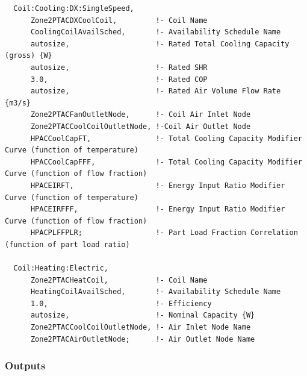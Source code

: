 \begin{lstlisting}
  Coil:Cooling:DX:SingleSpeed,
      Zone2PTACDXCoolCoil,         !- Coil Name
      CoolingCoilAvailSched,       !- Availability Schedule Name
      autosize,                    !- Rated Total Cooling Capacity (gross) {W}
      autosize,                    !- Rated SHR
      3.0,                         !- Rated COP
      autosize,                    !- Rated Air Volume Flow Rate {m3/s}
      Zone2PTACFanOutletNode,      !- Coil Air Inlet Node
      Zone2PTACCoolCoilOutletNode, !-Coil Air Outlet Node
      HPACCoolCapFT,               !- Total Cooling Capacity Modifier Curve (function of temperature)
      HPACCoolCapFFF,              !- Total Cooling Capacity Modifier Curve (function of flow fraction)
      HPACEIRFT,                   !- Energy Input Ratio Modifier Curve (function of temperature)
      HPACEIRFFF,                  !- Energy Input Ratio Modifier Curve (function of flow fraction)
      HPACPLFFPLR;                 !- Part Load Fraction Correlation (function of part load ratio)

  Coil:Heating:Electric,
      Zone2PTACHeatCoil,           !- Coil Name
      HeatingCoilAvailSched,       !- Availability Schedule Name
      1.0,                         !- Efficiency
      autosize,                    !- Nominal Capacity {W}
      Zone2PTACCoolCoilOutletNode, !- Air Inlet Node Name
      Zone2PTACAirOutletNode;      !- Air Outlet Node Name
\end{lstlisting}

\subsubsection{Outputs}\label{outputs-7-012}


